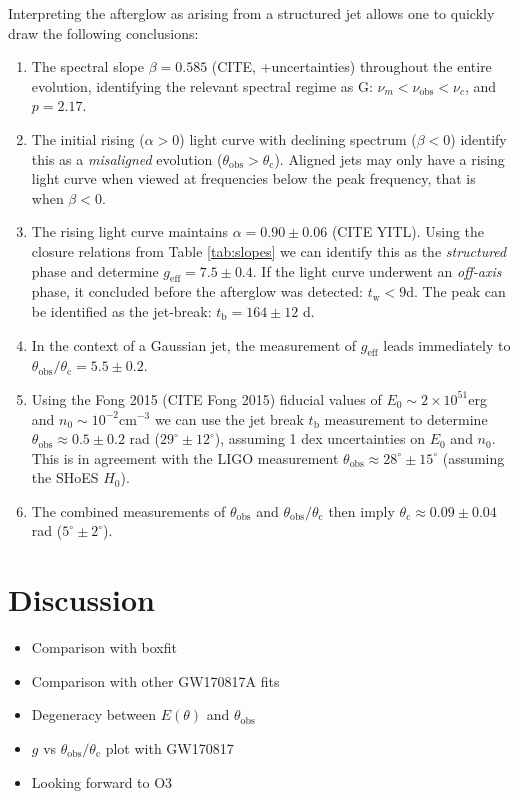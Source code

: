 \documentclass[twocolumn]{aastex62}
\newcommand{\tW}{\ensuremath{t_{\mathrm{w}}}}
\newcommand{\tb}{\ensuremath{t_{\mathrm{b}}}}
\newcommand{\nuobs}{\ensuremath{\nu_{\mathrm{obs}}}}
\newcommand{\thobs}{\ensuremath{\theta_{\mathrm{obs}}}}
\newcommand{\thC}{\ensuremath{\theta_{\mathrm{c}}}}
\newcommand{\geff}{\ensuremath{g_{\mathrm{eff}}}}
\begin{document}
Interpreting the afterglow as arising from a structured jet allows one to quickly draw the following conclusions:
\begin{enumerate}
	\item The spectral slope $\beta = 0.585$ (CITE, +uncertainties) throughout the entire evolution, identifying the relevant spectral regime as G: $\nu_m < \nuobs < \nu_c$, and $p = 2.17$.
	\item The initial rising ($\alpha > 0$) light curve with declining spectrum ($\beta < 0$) identify this as a \emph{misaligned} evolution ($\thobs > \thC$).  Aligned jets may only have a rising light curve when viewed at frequencies below the peak frequency, that is when $\beta < 0$.
	\item The rising light curve maintains $\alpha  = 0.90 \pm 0.06$ (CITE YITL).  Using the closure relations from Table \ref{tab:slopes} we can identify this as the \emph{structured} phase and determine $\geff = 7.5 \pm 0.4$.  If the light curve underwent an \emph{off-axis} phase, it concluded before the afterglow was detected: $\tW < 9$d.  The peak can be identified as the jet-break: $\tb = 164 \pm 12$ d.
	\item In the context of a Gaussian jet, the measurement of $\geff$ leads immediately to $\thobs / \thC = 5.5 \pm 0.2$.
	\item Using the Fong 2015 (CITE Fong 2015) fiducial values of $E_0 \sim 2\times 10^{51}$erg and $n_0 \sim 10^{-2}$cm$^{-3}$ we can use the jet break $\tb$ measurement to determine $\thobs \approx 0.5 \pm 0.2$ rad ($29^\circ \pm 12^\circ$), assuming 1 dex uncertainties on $E_0$ and $n_0$.    This is in agreement with the LIGO measurement $\thobs \approx 28^\circ \pm 15^\circ$ (assuming the SHoES $H_0$).
	\item The combined measurements of $\thobs$ and $\thobs/\thC$ then imply $\thC \approx 0.09 \pm 0.04$ rad ($5^\circ  \pm 2^\circ$).
	
\end{enumerate}



\section{Discussion}

\begin{itemize}
	\item Comparison with boxfit
	\item Comparison with other GW170817A fits
	\item Degeneracy between $E(\theta)$ and $\thobs$
	\item $g$ vs $\thobs / \thC$ plot with GW170817
	\item Looking forward to O3
\end{itemize}
\end{document}
